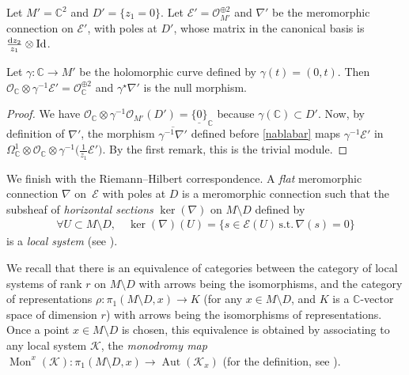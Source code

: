 \documentclass[pdftex]{sigma}
\numberwithin{equation}{section}
\begin{document}
\begin{Exemple}\label{exemplegeodesicisotrope} Let $M'=\mathbb{C}^2$ and $D'=\{z_1=0\}$. Let $\mathcal{E}'=\mathcal{O}_{M'}^{\oplus 2}$ and $\nabla'$ be the meromorphic connection on $\mathcal{E}'$, with poles at $D'$, whose matrix in the canonical basis is $\frac{{\rm d}z_2}{z_1} \otimes {\rm Id}$.

Let $\gamma\colon \mathbb{C} \longrightarrow M'$ be the holomorphic curve defined by $\gamma(t)=(0,t)$. Then $\mathcal{O}_\mathbb{C} \otimes \gamma^{-1}\mathcal{E}'= \mathcal{O}_\mathbb{C}^{\oplus 2}$ and $\gamma^\star \nabla'$ is the null morphism. \end{Exemple}
\begin{proof} We have $\mathcal{O}_\mathbb{C} \otimes \gamma^{-1} \mathcal{O}_{M'}(D') = \underline{\{0\}}_{\mathbb{C}}$ because $\gamma(\mathbb{C})\subset D'$. Now, by definition of $\nabla'$, the morphism $\overline{\gamma^{-1}\nabla'}$ defined before \eqref{nablabar} maps $\gamma^{-1}\mathcal{E}'$ in $\Omega_\mathbb{C}^1 \otimes \mathcal{O}_\mathbb{C} \otimes \gamma^{-1}\big(\frac{1}{z_1} \mathcal{E}'\big)$. By the first remark, this is the trivial module. \end{proof}

We finish with the Riemann--Hilbert correspondence. A \textit{flat} meromorphic connection $\nabla$ on~$\mathcal{E}$ with poles at $D$ is a meromorphic connection such that the subsheaf of \textit{horizontal sections} $\ker(\nabla)$ on $M\setminus D$ defined by
\begin{gather*}%
 \forall U\subset M\setminus D,\quad \ker(\nabla)(U) = \{ s\in \mathcal{E}(U)\, \text{s.t.}\, \nabla(s)=0\} \end{gather*}
 is a \textit{local system} (see \cite[Chapter~I, Theorem~2.17]{Deligne}).

We recall \cite[Chapter~I,  Theorem~2.17]{Deligne} that there is an equivalence of categories between the category of local systems of rank $r$ on $M\setminus D$ with arrows being the isomorphisms, and the category of representations $\rho \colon \pi_1(M\setminus D,x) \longrightarrow K$ (for any $x\in M\setminus D$, and $K$ is a $\mathbb{C}$-vector space of dimension $r$) with arrows being the isomorphisms of representations. Once a point $x\in M\setminus D$ is chosen, this equivalence is obtained by associating to any local system $\mathcal{K}$, the \textit{monodromy map} $\operatorname{Mon}^x(\mathcal{K})\colon \pi_1(M\setminus D,x) \longrightarrow \operatorname{Aut}(\mathcal{K}_x)$ (for the definition, see \cite[Chapter~I, Section~1.2]{Deligne}).
\end{document}
